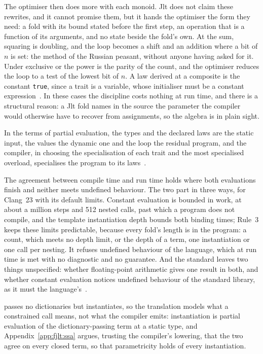 The optimiser then does more with each monoid.
Jlt does not claim these rewrites, and it cannot promise them, but it hands the optimiser the form they need: a fold with its bound stated before the first step, an operation that is a function of its arguments, and no state beside the fold's own.
At the sum, squaring is doubling, and the loop becomes a shift and an addition where a bit of $n$ is set: the method of the Russian peasant, without anyone having asked for it.
Under exclusive or the power is the parity of the count, and the optimiser reduces the loop to a test of the lowest bit of $n$.
A law derived at a composite is the constant \texttt{true}, since a trait is a  variable, whose initialiser must be a constant expression~\cite[{\texttt{dcl.constexpr}}]{cpp23standard}.
In these cases the discipline costs nothing at run time, and there is a structural reason: a Jlt fold names in the source the parameter the compiler would otherwise have to recover from assignments, so the algebra is in plain sight.

In the terms of partial evaluation, the types and the declared laws are the static input, the values the dynamic one and the loop the residual program, and the compiler, in choosing the specialisation of each trait and the most specialised overload, specialises the program to its laws~\cite{veldhuizen1999partial}.

The agreement between compile time and run time holds where both evaluations finish and neither meets undefined behaviour.
The two part in three ways, for Clang~23 with its default limits.
Constant evaluation is bounded in work, at about a million steps and 512 nested calls, past which a program does not compile, and the template instantiation depth bounds both binding times; Rule~3 keeps these limits predictable, because every fold's length is in the program: a count, which meets no depth limit, or the depth of a term, one instantiation or one call per nesting.
It refuses undefined behaviour of the language, which at run time is met with no diagnostic and no guarantee.
And the standard leaves two things unspecified: whether floating-point arithmetic gives one result in both, and whether constant evaluation notices undefined behaviour of the standard library, as it must the language's~\cite[{\texttt{expr.const}}]{cpp23standard}.

\Cpp{} passes no dictionaries but instantiates, so the translation models what a constrained call means, not what the compiler emits: instantiation is partial evaluation of the dictionary-passing term at a static type, and Appendix~\ref{app:fjlt:ssa} argues, trusting the compiler's lowering, that the two agree on every closed term, so that parametricity holds of every instantiation.

